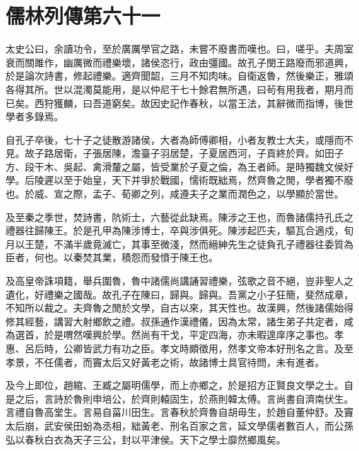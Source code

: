 \chapter{儒林列傳第六十一}

太史公曰，余讀功令，至於廣厲學官之路，未嘗不廢書而嘆也。曰，嗟乎。夫周室衰而關雎作，幽厲微而禮樂壞，諸侯恣行，政由彊國。故孔子閔王路廢而邪道興，於是論次詩書，修起禮樂。適齊聞韶，三月不知肉味。自衛返魯，然後樂正，雅頌各得其所。世以混濁莫能用，是以仲尼干七十餘君無所遇，曰茍有用我者，期月而已矣。西狩獲麟，曰吾道窮矣。故因史記作春秋，以當王法，其辭微而指博，後世學者多錄焉。

自孔子卒後，七十子之徒散游諸侯，大者為師傅卿相，小者友教士大夫，或隱而不見。故子路居衛，子張居陳，澹臺子羽居楚，子夏居西河，子貢終於齊。如田子方、段干木、吳起、禽滑釐之屬，皆受業於子夏之倫，為王者師。是時獨魏文侯好學。后陵遲以至于始皇，天下并爭於戰國，懦術既絀焉，然齊魯之閒，學者獨不廢也。於威、宣之際，孟子、荀卿之列，咸遵夫子之業而潤色之，以學顯於當世。

及至秦之季世，焚詩書，阬術士，六藝從此缺焉。陳涉之王也，而魯諸儒持孔氏之禮器往歸陳王。於是孔甲為陳涉博士，卒與涉俱死。陳涉起匹夫，驅瓦合適戍，旬月以王楚，不滿半歲竟滅亡，其事至微淺，然而縉紳先生之徒負孔子禮器往委質為臣者，何也。以秦焚其業，積怨而發憤于陳王也。

及高皇帝誅項籍，舉兵圍魯，魯中諸儒尚講誦習禮樂，弦歌之音不絕，豈非聖人之遺化，好禮樂之國哉。故孔子在陳曰，歸與。歸與。吾黨之小子狂簡，斐然成章，不知所以裁之。夫齊魯之閒於文學，自古以來，其天性也。故漢興，然後諸儒始得修其經藝，講習大射鄉飲之禮。叔孫通作漢禮儀，因為太常，諸生弟子共定者，咸為選首，於是喟然嘆興於學。然尚有干戈，平定四海，亦未暇遑庠序之事也。孝惠、呂后時，公卿皆武力有功之臣。孝文時頗徵用，然孝文帝本好刑名之言。及至孝景，不任儒者，而竇太后又好黃老之術，故諸博士具官待問，未有進者。

及今上即位，趙綰、王臧之屬明儒學，而上亦鄉之，於是招方正賢良文學之士。自是之后，言詩於魯則申培公，於齊則轅固生，於燕則韓太傅。言尚書自濟南伏生。言禮自魯高堂生。言易自菑川田生。言春秋於齊魯自胡毋生，於趙自董仲舒。及竇太后崩，武安侯田蚡為丞相，絀黃老、刑名百家之言，延文學儒者數百人，而公孫弘以春秋白衣為天子三公，封以平津侯。天下之學士靡然鄉風矣。

